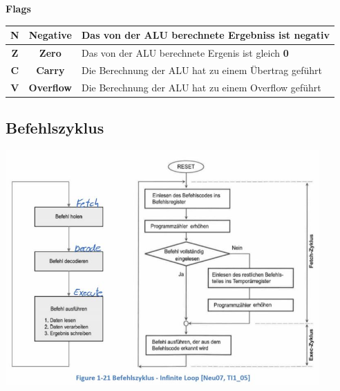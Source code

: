 \begin{multicols}{2}
\begin{minipage}{8cm}
\textbf{Flags}\newline
\begin{tabular}{|c|c|l|}
    \hline 
    \textbf{N}  & \textbf{Negative} & Das von der ALU berechnete Ergebniss ist negativ \\ 
    \hline 
    \textbf{Z}  & \textbf{Zero} & Das von der ALU berechnete Ergenis ist gleich \textbf{0} \\ 
    \hline 
    \textbf{C}  &\textbf{Carry}  &Die Berechnung der ALU hat zu einem Übertrag geführt  \\ 
    \hline 
    \textbf{V}  &\textbf{Overflow}  & Die Berechnung der ALU hat zu einem Overflow geführt  \\ 
    \hline 
\end{tabular} 
\end{minipage}


\end{multicols}

\subsection{Befehlszyklus}
    \includegraphics[height=9cm]{images/CommandFlowChart}
